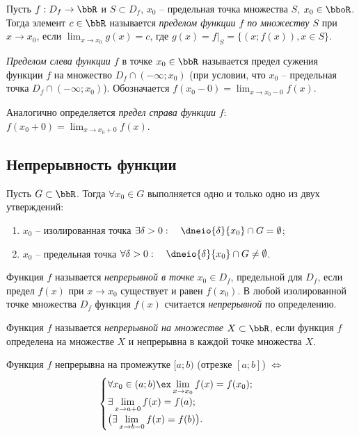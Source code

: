 \begin{defn}
Пусть $f: D_f \to \bbR$ и $S \subset D_f$, $x_0$ -- предельная точка множества $S$, $x_0 \in \bboR$. Тогда элемент $c \in \bbR$ называется \textit{пределом функции $f$ по множеству $S$} при $x \to x_0$, если $\lim_{x \to x_0}\limits g(x) = c$, где $g(x)=\left.f\right|_S = \{(x;f(x)),x \in S\}$.
\end{defn}

\begin{defn}
\textit{Пределом слева функции $f$} в точке $x_0 \in \bbR$ называется предел сужения функции $f$ на множество $D_f \cap (-\infty;x_0)$ (при условии, что  $x_0$ -- предельная точка $D_f \cap (-\infty;x_0)$). Обозначается $f(x_0-0)=\lim_{x \to x_0-0}\limits f(x)$.

Аналогично определяется \textit{предел справа функции} $f$: $f(x_0+0)=\lim_{x \to x_0+0}\limits f(x)$. 
\end{defn}



\subsection{Непрерывность функции}
Пусть $G \subset \bbR$. Тогда $\forall x_0 \in G$ выполняется одно и только одно из двух утверждений:
\begin{enumerate}
\item $x_0$ -- изолированная точка $\exists \delta>0:\quad \dneio{\delta}{x_0} \cap G = \emptyset$;
\item $x_0$ -- предельная точка $\forall \delta > 0:\quad \dneio{\delta}{x_0}\cap G \neq \emptyset$.
\end{enumerate}

\begin{defn}
Функция $f$ называется \textit{непрерывной в точке} $x_0 \in D_f$, предельной для $D_f$, если предел $f(x)$ при $x \to x_0$ существует и равен $f(x_0)$. В любой изолированной точке множества $D_f$ функция $f(x)$ считается \textit{непрерывной} по определению. 
\end{defn}

\begin{defn}
Функция $f$ называется \textit{непрерывной на множестве} $X \subset \bbR$, если функция $f$ определена на множестве $X$ и непрерывна в каждой точке множества $X$. 
\end{defn}
\begin{lemm}
Функция $f$ непрерывна на промежутке $[a;b)$ (отрезке $[a;b]$) $\Longleftrightarrow$ 
$$
\begin{cases}
\forall x_0 \in (a;b) \ex \lim_{x \to x_0}\limits f(x) = f(x_0);\\
\exists \lim_{x \to a+0}\limits f(x) = f(a);\\
\bigr(\exists \lim_{x \to b-0}\limits f(x) = f(b)\bigl).\\
\end{cases}
$$  
\end{lemm}


